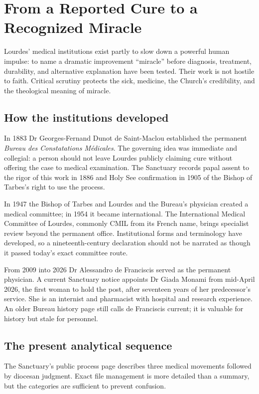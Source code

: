 \section{From a Reported Cure to a Recognized Miracle}

Lourdes' medical institutions exist partly to slow down a powerful human impulse: to name a dramatic improvement “miracle” before diagnosis, treatment, durability, and alternative explanation have been tested. Their work is not hostile to faith. Critical scrutiny protects the sick, medicine, the Church's credibility, and the theological meaning of miracle.

\subsection{How the institutions developed}

In 1883 Dr Georges-Fernand Dunot de Saint-Maclou established the permanent \emph{Bureau des Constatations Médicales}. The governing idea was immediate and collegial: a person should not leave Lourdes publicly claiming cure without offering the case to medical examination. The Sanctuary records papal assent to the rigor of this work in 1886 and Holy See confirmation in 1905 of the Bishop of Tarbes's right to use the process.

In 1947 the Bishop of Tarbes and Lourdes and the Bureau's physician created a medical committee; in 1954 it became international. The International Medical Committee of Lourdes, commonly CMIL from its French name, brings specialist review beyond the permanent office. Institutional forms and terminology have developed, so a nineteenth-century declaration should not be narrated as though it passed today's exact committee route.

From 2009 into 2026 Dr Alessandro de Franciscis served as the permanent physician. A current Sanctuary notice appoints Dr Giada Monami from mid-April 2026, the first woman to hold the post, after seventeen years of her predecessor's service. She is an internist and pharmacist with hospital and research experience. An older Bureau history page still calls de Franciscis current; it is valuable for history but stale for personnel.

\subsection{The present analytical sequence}

The Sanctuary's public process page describes three medical movements followed by diocesan judgment. Exact file management is more detailed than a summary, but the categories are sufficient to prevent confusion.

